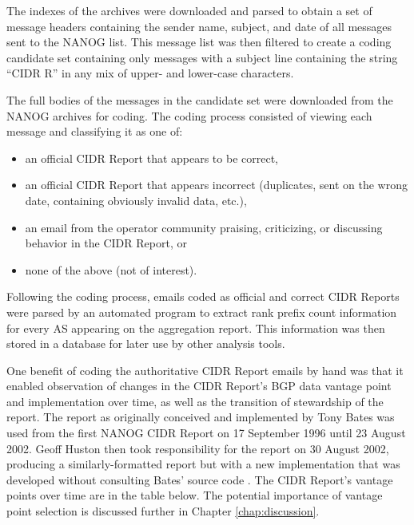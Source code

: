 The indexes of the archives were downloaded and parsed to obtain a set of
message headers containing the sender name, subject, and date of all messages
sent to the NANOG list. This message list was then filtered to create a coding
candidate set containing only messages with a subject line containing the
string ``CIDR R'' in any mix of upper- and lower-case characters.

The full bodies of the messages in the candidate set were downloaded from the
NANOG archives for coding. The coding process consisted of viewing each message
and classifying it as one of:

\begin{itemize}
    \item{an official CIDR Report that appears to be correct,}
    \item{an official CIDR Report that appears incorrect (duplicates, sent on
    the wrong date, containing obviously invalid data, etc.),}
    \item{an email from the operator community praising, criticizing, or
    discussing behavior in the CIDR Report, or}
    \item{none of the above (not of interest).}
\end{itemize}

Following the coding process, emails coded as official and correct CIDR Reports
were parsed by an automated program to extract rank prefix count information
for every AS appearing on the aggregation report. This information was then
stored in a database for later use by other analysis tools.


One benefit of coding the authoritative CIDR Report emails by hand was that it
enabled observation of changes in the CIDR Report's BGP data vantage point and
implementation over time, as well as the transition of stewardship of the
report. The report as originally conceived and implemented by Tony Bates was
used from the first NANOG CIDR Report on 17 September 1996 until 23 August
2002. Geoff Huston then took responsibility for the report on 30 August 2002,
producing a similarly-formatted report but with a new implementation that was
developed without consulting Bates' source code \cite{Huston:2011ys}. The CIDR
Report's vantage points over time are in the table below. The potential
importance of vantage point selection is discussed further in Chapter
\ref{chap:discussion}.

